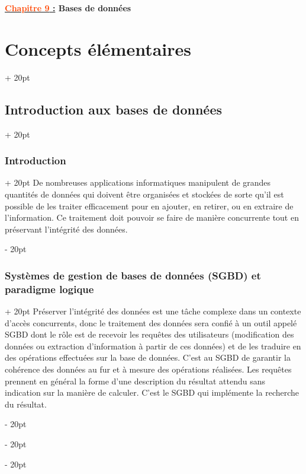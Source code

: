 \documentclass[a4paper, 12pt, twoside]{article}
\author{Lasercata}
\date{\today}
\renewcommand{\emph}{\textcolor{ff4500}}
\newcommand{\ind}[1][20pt]{\advance\leftskip + #1}
\newcommand{\deind}[1][20pt]{\advance\leftskip - #1}
\newenvironment{indt}[2][20pt]{#2 \par \ind[#1]}{\par \deind} %
\newcommand{\thetitle}[2]{\begin{center}\textbf{{\LARGE \underline{\emph{#1} :}} {\Large #2}}\end{center}}
\begin{document}
    
    
    \thetitle{Chapitre 9}{Bases de données}
    
    \tableofcontents
    \newpage
    
    
    \begin{indt}{\section{Concepts élémentaires}}
        
        \begin{indt}{\subsection{Introduction aux bases de données}}
            \begin{indt}{\subsubsection{Introduction}}
                De nombreuses applications informatiques manipulent de grandes quantités de données qui doivent être organisées et stockées de sorte qu'il est possible de les traiter efficacement pour en ajouter, en retirer, ou en extraire de l'information. Ce traitement doit pouvoir se faire de manière concurrente tout en préservant l'intégrité des données.
            \end{indt}
            
            \vspace{12pt}
            
            \begin{indt}{\subsubsection{Systèmes de gestion de bases de données (SGBD) et paradigme logique}}
                Préserver l'intégrité des données est une tâche complexe dans un contexte d'accès concurrents, donc le traitement des données sera confié à un outil appelé SGBD dont le rôle est de recevoir les requêtes des utilisateurs (modification des données ou extraction d'information à partir de ces données) et de les traduire en des opérations effectuées sur la base de données. C'est au SGBD de garantir la cohérence des données au fur et à mesure des opérations réalisées. Les requêtes prennent en général la forme d'une description du résultat attendu sans indication sur la manière de calculer. C'est le SGBD qui implémente la recherche du résultat.
                

\end{indt}
\end{indt}
\end{indt}
\end{document}
